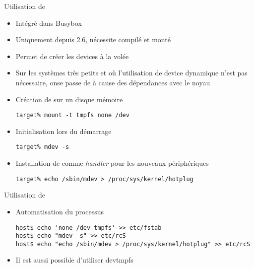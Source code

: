 \begin{frame}[fragile=singleslide]{Utilisation de }
  \begin{itemize}
  \item Intégré dans Busybox
  \item Uniquement depuis 2.6, nécessite  compilé et monté
  \item Permet de créer les devices à la volée
  \item Sur  les systèmes  très petits et  où l'utilisation  de device
    dynamique n'est  pas nécessaire, onse passe de   à cause
    des dépendances avec le noyau
  \item Création de  sur un disque mémoire
    \begin{lstlisting}
target% mount -t tmpfs none /dev
    \end{lstlisting}
  \item Initialisation  lors du démarrage
    \begin{lstlisting}
target% mdev -s
    \end{lstlisting}
  \item  Installation  de    comme \emph{handler}  pour  les
    nouveaux périphériques
    \begin{lstlisting}
target% echo /sbin/mdev > /proc/sys/kernel/hotplug
    \end{lstlisting}
  \end{itemize}
\end{frame}

\begin{frame}[fragile=singleslide]{Utilisation de }
  \begin{itemize}
  \item  Automatisation du processus
    \begin{lstlisting}
host$ echo 'none /dev tmpfs' >> etc/fstab
host$ echo "mdev -s" >> etc/rcS
host$ echo "echo /sbin/mdev > /proc/sys/kernel/hotplug" >> etc/rcS
    \end{lstlisting}
  \item Il est aussi possible d'utiliser devtmpfs
  \end{itemize}
\end{frame}

